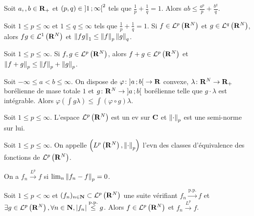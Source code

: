 \begin{lem}
	Soit $a,,b \in \mathbf{R}_+$ et $(p,q) \in \mathopen{}\mathclose{\left]1\mathclose{}\mathpunct{};\infty\right[}^2$ tels que $\frac{1}{p} + \frac{1}{q} = 1$.
	Alors $ab \leq \frac{a^p}{p} + \frac{b^q}{q}$.
\end{lem}

\begin{thm}
	Soit $1 \leq p \leq \infty$ et $1 \leq q \leq \infty$ tels que $\frac{1}{p} + \frac{1}{q} = 1$.
	Si $f \in \mathcal{L}^p \left( \mathbf{R}^N \right)$ et $g \in \mathcal{L}^q \left( \mathbf{R}^N \right)$, alors $fg \in \mathcal{L}^1 \left( \mathbf{R}^N \right)$ et $\left\lVert fg\right\rVert_1 \leq \left\lVert f\right\rVert_p \left\lVert g\right\rVert_q$.
\end{thm}

\begin{thm}
	Soit $1 \leq p \leq \infty$.
	Si $f,g \in \mathcal{L}^p \left( \mathbf{R}^N \right)$, alors $f + g \in \mathcal{L}^p \left( \mathbf{R}^N \right)$ et $\left\lVert f + g\right\rVert_p \leq \left\lVert f\right\rVert_p + \left\lVert g\right\rVert_p$.
\end{thm}

\begin{thm}
	Soit $-\infty \leq a < b \leq \infty$.
	On dispose de $\varphi \colon \mathopen{}\mathclose{\left]a\mathclose{}\mathpunct{};b\right[} \to \mathbf{R}$ convexe, $\lambda \colon \mathbf{R}^N \to \mathbf{R}_+$ borélienne de mase totale $1$ et $g \colon \mathbf{R}^N \to \mathopen{}\mathclose{\left]a\mathclose{}\mathpunct{};b\right[}$ borélienne telle que $g \cdot \lambda$ est intégrable.
	Alors $\varphi \left( \int g \lambda \right) \leq \int (\varphi \circ g) \lambda$.
\end{thm}

\begin{thm}
	Soit $1 \leq p \leq \infty$.
	L'espace $\mathcal{L}^p \left( \mathbf{R}^N \right)$ est un ev sur $\mathbf{C}$ et $\left\lVert\cdot\right\rVert_p$ est une semi-norme sur lui.
\end{thm}

\begin{defn}
	Soit $1 \leq p \leq \infty$.
	On appelle $\left( L^p \left( \mathbf{R}^N \right), \left\lVert\cdot\right\rVert_p \right)$ l'evn des classes d'équivalence des fonctions de $\mathcal{L}^p \left( \mathbf{R}^N \right)$.
\end{defn}

\begin{defn}
	On a $f_n \overset{L^p}{\to} f$ si $\lim_n \left\lVert f_n - f\right\rVert_p = 0$.
\end{defn}

\begin{thm}
	Soit $1 \leq p < \infty$ et $(f_n)_{n \in \mathbf{N}} \subset \mathcal{L}^p \left( \mathbf{R}^N \right)$ une suite vérifiant $f_n \overset{\text{p.p.}}{\to} f$ et $\exists g \in \mathcal{L}^p \left( \mathbf{R}^N \right), \forall n \in \mathbf{N}, \left\lvert f_n\right\rvert \overset{\text{p.p.}}{\leq} g$.
	Alors $f \in \mathcal{L}^p \left( \mathbf{R}^N \right)$ et $f_n \overset{L^p}{\to} f$.
\end{thm}

